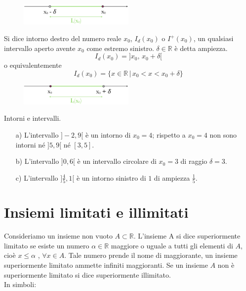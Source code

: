\begin{figure}[htpb!]
  \centering
  \includegraphics[width=0.5\textwidth]{img/top_3.png}%
\end{figure}

\begin{definizione}
  Si dice intorno destro del numero reale $x_0$, $I_d(x_0)$ o 
$I^+(x_0)$, un qualsiasi intervallo aperto avente $x_0$ come estremo 
sinistro. $\delta\in\mathbb{R}$ è detta ampiezza.\\
\begin{equation}
  I_d(x_0)=]x_0,\,x_0+\delta[
\end{equation}
o equivalentemente
\begin{equation}
  I_d(x_0)=\{x\in \mathbb{R}\,\vert\, x_0 < x<x_0+\delta\}
\end{equation}
\end{definizione}

\begin{figure}[htpb!]
  \centering
  \includegraphics[width=0.5\textwidth]{img/top_4a.png}%
\end{figure}

\begin{esempio} Intorni e intervalli.
\begin{itemize}
  \item[a)] L'intervallo $]-2, 9[$ è un intorno di $x_0=4$; rispetto a 
$x_0=4$ non sono intorni né $]5, 9[$ né $[3, 5]$.\\
  \item[b)] L'intervallo $]0, 6[$ è un intervallo circolare di $x_0=3$ 
di raggio $\delta=3$.\\
  \item[c)] L'intervallo $]\frac{4}{5},1[$ è un intorno sinistro di $1$ 
di ampiezza $\frac{1}{5}$. \\
\end{itemize}
\end{esempio}

\section{Insiemi limitati e illimitati}
Consideriamo un insieme non vuoto $A\subset \mathbb{R}$. L'insieme A si dice 
superiormente limitato se esiste un numero $\alpha \in \mathbb{R}$ maggiore o 
uguale a tutti gli elementi di $A$, cioè $x\leq\alpha$ , $\forall x\in A$. 
Tale numero prende il nome di maggiorante, un insieme superiormente limitato 
ammette infiniti maggioranti. Se un insieme $A$ non è superiormente limitato 
si dice superiormente illimitato.\\
In simboli:\\

